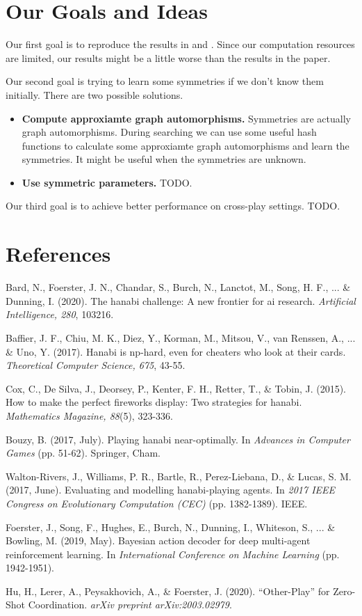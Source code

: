 \documentclass[12pt]{article}
\begin{document}
\section{Our Goals and Ideas}
Our first goal is to reproduce the results in \cite{FSH+19} and \cite{HLPF20}. Since our computation resources are limited, our results might be a little worse than the results in the paper.

Our second goal is trying to learn some symmetries if we don't know them initially. There are two possible solutions.
\begin{itemize}
\vspace{-1ex}
\item \textbf{Compute approxiamte graph automorphisms.} Symmetries are actually graph automorphisms. During searching we can use some useful hash functions to calculate some approxiamte graph automorphisms and learn the symmetries. It might be useful when the symmetries are unknown.
\vspace{-1ex}
\item \textbf{Use symmetric parameters.} TODO.
\end{itemize}

Our third goal is to achieve better performance on cross-play settings. TODO.

\section*{References}
\begin{enumerate}[\lbrack 1\rbrack]
 Bard, N., Foerster, J. N., Chandar, S., Burch, N., Lanctot, M., Song, H. F., ... \& Dunning, I. (2020). The hanabi challenge: A new frontier for ai research. \textsl{Artificial Intelligence, 280}, 103216.

 Baffier, J. F., Chiu, M. K., Diez, Y., Korman, M., Mitsou, V., van Renssen, A., ... \& Uno, Y. (2017). Hanabi is np-hard, even for cheaters who look at their cards. \textsl{Theoretical Computer Science, 675}, 43-55.

 Cox, C., De Silva, J., Deorsey, P., Kenter, F. H., Retter, T., \& Tobin, J. (2015). How to make the perfect fireworks display: Two strategies for hanabi. \textsl{Mathematics Magazine, 88}(5), 323-336.

 Bouzy, B. (2017, July). Playing hanabi near-optimally. In \textsl{Advances in Computer Games} (pp. 51-62). Springer, Cham.

 Walton-Rivers, J., Williams, P. R., Bartle, R., Perez-Liebana, D., \& Lucas, S. M. (2017, June). Evaluating and modelling hanabi-playing agents. In \textsl{2017 IEEE Congress on Evolutionary Computation (CEC)} (pp. 1382-1389). IEEE.

 Foerster, J., Song, F., Hughes, E., Burch, N., Dunning, I., Whiteson, S., ... \& Bowling, M. (2019, May). Bayesian action decoder for deep multi-agent reinforcement learning. In \textsl{International Conference on Machine Learning} (pp. 1942-1951).

 Hu, H., Lerer, A., Peysakhovich, A., \& Foerster, J. (2020). ``Other-Play'' for Zero-Shot Coordination. \textsl{arXiv preprint arXiv:2003.02979}.
\end{enumerate}
\end{document}
